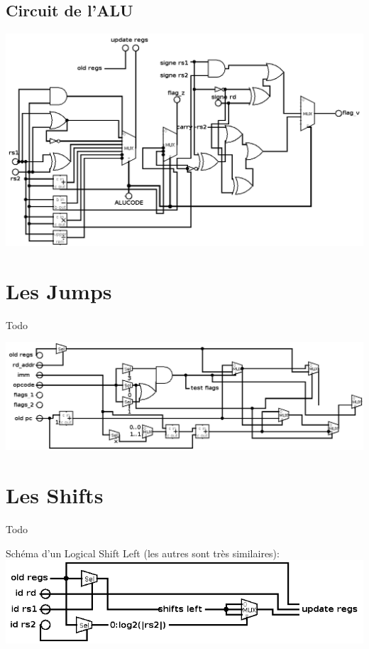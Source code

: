 \documentclass[french, 12pt]{article}
\begin{document}
\subsection*{Circuit de l'ALU}

\includegraphics[width=17cm]{circuit_alu.png}

\section*{Les Jumps}

Todo

\includegraphics[width=17cm]{circuit_jump.png}
\section*{Les Shifts}

Todo

Schéma d'un Logical Shift Left (les autres sont très similaires):\\

\includegraphics[width=17cm]{circuit_shift.png}
\end{document}
